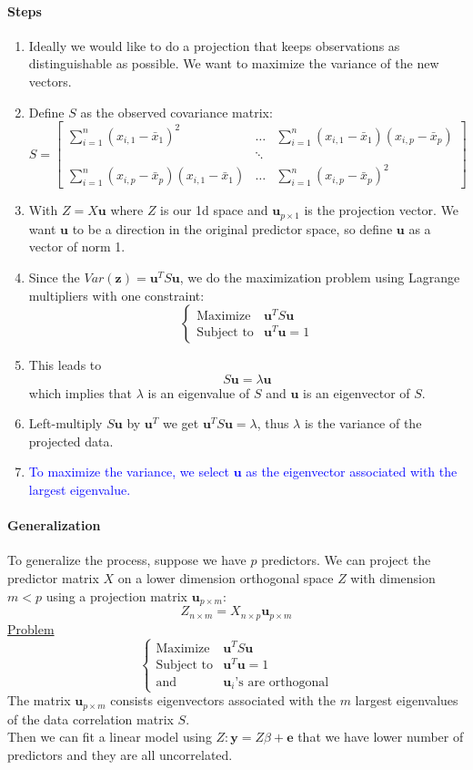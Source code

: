 \documentclass[11pt]{article}
\newcommand{\tb}[1]{\textbf{#1}}
\newcommand{\under}[1]{\underline{#1}}
\newcommand{\vy}[0]{\tb{y}}
\newcommand{\vz}[0]{\tb{z}}
\newcommand{\ve}[0]{\tb{e}}
\newcommand{\vu}[0]{\tb{u}}
\begin{document}
\paragraph{Steps}
\begin{enumerate}
	\item Ideally we would like to do a projection that keeps observations as distinguishable as possible. We want to maximize the variance of the new vectors.
	\item Define $S$ as the observed covariance matrix:
	$$ S = \begin{bmatrix}
		\sum_{i=1}^n (x_{i,1} - \bar{x}_1)^2 & \hdots & \sum_{i=1}^n(x_{i,1} - \bar{x}_1)(x_{i,p} - \bar{x}_p) \\
		&\ddots \\
		\sum_{i=1}^n (x_{i,p} - \bar{x}_p)(x_{i,1} - \bar{x}_1) &\hdots & \sum_{i=1}^n(x_{i,p} - \bar{x}_p)^2
	\end{bmatrix} $$
	\item With $Z = X\vu$ where $Z$ is our 1d space and $\vu_{p\times 1}$ is the projection vector. We want $\vu$ to be a direction in the original predictor space, so define $\vu$ as a vector of norm 1.
	\item Since the $Var(\vz) = \vu^TS\vu$, we do the maximization problem using Lagrange multipliers with one constraint:
	$$\begin{cases}
		\text{Maximize} & \vu^TS\vu  \\
		\text{Subject to} & \vu^T\vu = 1
	\end{cases} $$
	\item This leads to $$S\vu = \lambda\vu$$ which implies that $\lambda$ is an eigenvalue of $S$ and $\vu$ is an eigenvector of $S$.
	\item Left-multiply $S\vu$ by $\vu^T$ we get $\vu^TS\vu = \lambda$, thus $\lambda$ is the variance of the projected data.
	\item \textcolor{blue}{To maximize the variance, we select $\vu$ as the eigenvector associated with the largest eigenvalue.}
\end{enumerate}

\paragraph{Generalization}
To generalize the process, suppose we have $p$ predictors. We can project the predictor matrix $X$ on a lower dimension orthogonal space $Z$ with dimension $m < p$ using a projection matrix $\vu_{p\times m}$:
$$Z_{n\times m} = X_{n \times p}\vu_{p\times m}$$
\under{Problem}
	$$\begin{cases}
		\text{Maximize} & \vu^TS\vu  \\
		\text{Subject to} & \vu^T\vu =1 \\
		\text{and} & \vu_i \text{'s are orthogonal}
	\end{cases} $$
The matrix $\vu_{p\times m}$ consists eigenvectors associated with the $m$ largest eigenvalues of the data correlation matrix $S$. \\
Then we can fit a linear model using $Z: \vy = Z\beta + \ve$ that we have lower number of predictors and they are all uncorrelated.
\end{document}
